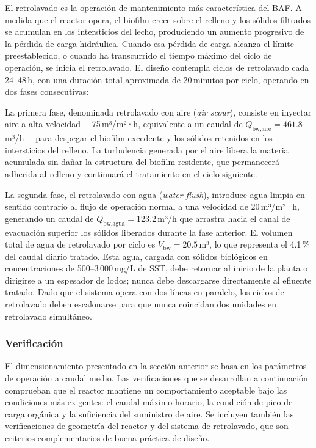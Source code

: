 \documentclass[12pt,a4paper]{article}
\begin{document}
El retrolavado es la operación de mantenimiento más característica del BAF. A medida que el reactor opera, el biofilm crece sobre el relleno y los sólidos filtrados se acumulan en los intersticios del lecho, produciendo un aumento progresivo de la pérdida de carga hidráulica. Cuando esa pérdida de carga alcanza el límite preestablecido, o cuando ha transcurrido el tiempo máximo del ciclo de operación, se inicia el retrolavado. El diseño contempla ciclos de retrolavado cada 24--48\,h, con una duración total aproximada de 20\,minutos por ciclo, operando en dos fases consecutivas:

La primera fase, denominada retrolavado con aire (\textit{air scour}), consiste en inyectar aire a alta velocidad —75\,m³/m²·h, equivalente a un caudal de $Q_{\text{bw,aire}} = 461.8$\,m³/h— para despegar el biofilm excedente y los sólidos retenidos en los intersticios del relleno. La turbulencia generada por el aire libera la materia acumulada sin dañar la estructura del biofilm residente, que permanecerá adherida al relleno y continuará el tratamiento en el ciclo siguiente.

La segunda fase, el retrolavado con agua (\textit{water flush}), introduce agua limpia en sentido contrario al flujo de operación normal a una velocidad de 20\,m³/m²·h, generando un caudal de $Q_{\text{bw,agua}} = 123.2$\,m³/h que arrastra hacia el canal de evacuación superior los sólidos liberados durante la fase anterior. El volumen total de agua de retrolavado por ciclo es $V_{\text{bw}} = 20.5$\,m³, lo que representa el 4.1\,\% del caudal diario tratado. Esta agua, cargada con sólidos biológicos en concentraciones de 500--3\,000\,mg/L de SST, debe retornar al inicio de la planta o dirigirse a un espesador de lodos; nunca debe descargarse directamente al efluente tratado. Dado que el sistema opera con dos líneas en paralelo, los ciclos de retrolavado deben escalonarse para que nunca coincidan dos unidades en retrolavado simultáneo.

\subsubsection{Verificación}

El dimensionamiento presentado en la sección anterior se basa en los parámetros de operación a caudal medio. Las verificaciones que se desarrollan a continuación comprueban que el reactor mantiene un comportamiento aceptable bajo las condiciones más exigentes: el caudal máximo horario, la condición de pico de carga orgánica y la suficiencia del suministro de aire. Se incluyen también las verificaciones de geometría del reactor y del sistema de retrolavado, que son criterios complementarios de buena práctica de diseño.
\end{document}
